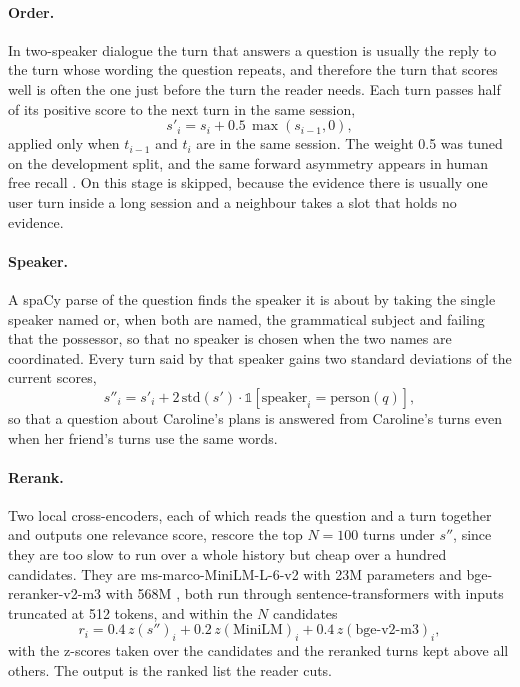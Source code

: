 \paragraph{Order.}
In two-speaker dialogue the turn that answers a question is usually the reply to the turn whose wording the question repeats, and therefore the turn that scores well is often the one just before the turn the reader needs. Each turn passes half of its positive score to the next turn in the same session,
\begin{equation}
s'_i = s_i + 0.5\, \max(s_{i-1}, 0),
\label{eq:contig}
\end{equation}
applied only when $t_{i-1}$ and $t_i$ are in the same session. The weight 0.5 was tuned on the development split, and the same forward asymmetry appears in human free recall \citep{howard2002tcm,kahana1996associative}. On \lmes{} this stage is skipped, because the evidence there is usually one user turn inside a long session and a neighbour takes a slot that holds no evidence.

\paragraph{Speaker.}
A spaCy parse of the question \citep{honnibal2020spacy} finds the speaker it is about by taking the single speaker named or, when both are named, the grammatical subject and failing that the possessor, so that no speaker is chosen when the two names are coordinated. Every turn said by that speaker gains two standard deviations of the current scores,
\begin{equation}
s''_i = s'_i + 2\, \mathrm{std}(s') \cdot \mathbb{1}[\mathrm{speaker}_i = \mathrm{person}(q)] ,
\label{eq:prior}
\end{equation}
so that a question about Caroline's plans is answered from Caroline's turns even when her friend's turns use the same words.

\paragraph{Rerank.}
Two local cross-encoders, each of which reads the question and a turn together and outputs one relevance score, rescore the top $N = 100$ turns under $s''$, since they are too slow to run over a whole history but cheap over a hundred candidates. They are ms-marco-MiniLM-L-6-v2 with 23M parameters \citep{bajaj2016msmarco,nogueira2019passage,wang2020minilm} and bge-reranker-v2-m3 with 568M \citep{chen2024bgem3}, both run through sentence-transformers \citep{reimers2019sentencebert} with inputs truncated at 512 tokens, and within the $N$ candidates
\begin{equation}
r_i = 0.4\, z(s'')_i + 0.2\, z(\mathrm{MiniLM})_i + 0.4\, z(\mathrm{bge\text{-}v2\text{-}m3})_i ,
\label{eq:rerank}
\end{equation}
with the z-scores taken over the candidates and the reranked turns kept above all others. The output is the ranked list the reader cuts.

